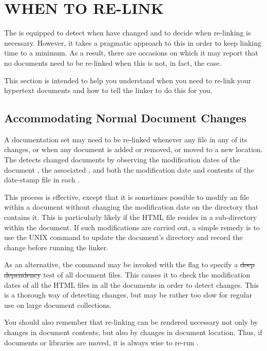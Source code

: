 \section{WHEN TO RE-LINK}

The   is equipped to detect when
 have changed and to decide when re-linking is
necessary. However, it takes a pragmatic approach to this in order to
keep linking time to a minimum. As a result, there are occasions on
which it may report that no documents need to be re-linked when this
is not, in fact, the case.

This section is intended to help you understand when you need to
re-link your hypertext documents and how to tell the
linker to do this for you.

\subsection{Accommodating Normal Document Changes}

A documentation set may need to be re-linked whenever any file in any
of its  changes, or when any document is added or
removed, or moved to a new location.  The 
 detects changed documents by observing the
modification dates of the document , the
associated , and both the modification date and
contents of the  date-stamp file in each .

This process is effective, except that it is sometimes possible to
modify an  file within a document without changing the
modification date on the  directory that contains it. This is
particularly likely if the HTML file resides in a sub-directory within
the document. If such modifications are carried out, a simple remedy
is to use the UNIX  command to update the document's
 directory and record the change before running the linker.

As an alternative, the  command may be invoked with the
 flag to specify a \st{deep dependency} test of all document
files. This causes it to check the modification dates of all the HTML
files in all the documents in order to detect changes. This is a
thorough way of detecting changes, but may be rather too slow for
regular use on large document collections.

You should also remember that re-linking can be rendered necessary not
only by changes in document contents, but also by changes in document
location. Thus, if documents or libraries are moved, it is always wise
to re-run .

